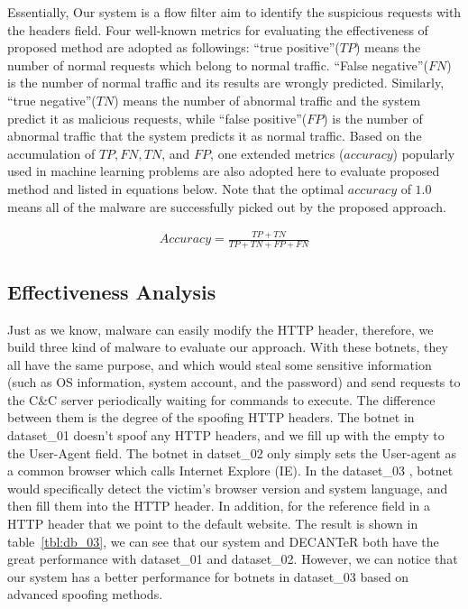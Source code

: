 Essentially, Our system is a flow filter aim to identify the suspicious requests with the headers field. Four well-known metrics for evaluating the effectiveness of proposed method are adopted as followings: ``true positive''($TP$) means the number of normal requests which belong to normal traffic. ``False negative''($FN$) is the number of normal traffic and its results are wrongly predicted. Similarly, ``true negative''($TN$) means the number of abnormal traffic and the system predict it as malicious requests, while ``false positive''($FP$) is the number of abnormal traffic that the system predicts it as normal traffic. Based on the accumulation of $TP, FN, TN$, and $FP$, one extended metrics ($accuracy$) popularly used in machine learning problems are also adopted here to evaluate proposed method and listed in equations below. Note that the optimal $accuracy$ of $1.0$ means all of the malware are successfully picked out by the proposed approach. 


\begin{eqnarray}
\label{eq:accuracy}
Accuracy = \frac{TP+TN}{TP+TN+FP+FN}
\end{eqnarray}

\subsection{Effectiveness Analysis}

Just as we know, malware can easily modify the HTTP header, therefore, we build three kind of malware to evaluate our approach. With these botnets, they all have the same purpose, and which would steal some sensitive information (such as OS information, system account, and the password) and send requests to the C\&C server periodically waiting for commands to execute. The difference between them is the degree of the spoofing HTTP headers. The botnet in dataset\_01 doesn't spoof any HTTP headers, and we fill up with the empty to the User-Agent field. The botnet in datset\_02 only simply sets the User-agent as a common browser which calls Internet Explore (IE). In the dataset\_03 , botnet would specifically detect the victim's browser version and system language, and then fill them into the HTTP header. In addition, for the reference field in a HTTP header that we point to the default website. The result is shown in table~\ref{tbl:db_03}, we can see that our system and DECANTeR \cite{bortolameotti2017decanter} both have the great performance with dataset\_01 and dataset\_02. However, we can notice that our system has a better performance for botnets in dataset\_03 based on advanced spoofing methods.

